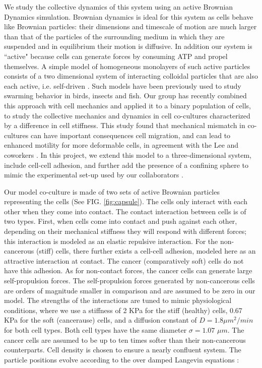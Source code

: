 \documentclass[aps,prb,twocolumn,groupedaddress,nofootinbib,floatfix]{revtex4}
\begin{document}
We study the collective dynamics of this system using an active Brownian Dynamics simulation. Brownian dynamics is ideal for this system as cells behave like Brownian particles: 
their dimensions and timescale of motion are much larger than that of the particles of the surrounding medium in which they are suspended and in equilibrium  their motion is diffusive. In addition
our system is ``active" because cells can generate forces by consuming ATP and propel themselves. A simple model of homogeneous monolayers of such active particles consists
of a two dimensional system of interacting colloidal particles that are also each active, i.e. self-driven \cite{FilyMarchetti,RednerBaskaran}. 
Such models have been previously used to study swarming  behavior \cite{Vicsek} in birds, insects and fish. Our group has recently combined this approach with cell 
mechanics and applied it to a binary population of cells, to study the collective mechanics and dynamics in cell co-cultures characterized by a difference in cell stiffness.
This study found that mechanical mismatch in co-cultures can have important consequences cell migration, and can lead to enhanced motility for more deformable cells\cite{Butcher}, 
in agreement with the Lee and coworkers \cite{Lee}. In this project, we extend this model to a three-dimensional system, include cell-cell adhesion, and further add the presence of a 
confining sphere to mimic the experimental set-up used by our collaborators \cite{Mingming}. 


Our model co-culture is made of two sets of active Brownian particles representing the cells (See FIG. \ref{fig:capsule}). The cells only interact with each other when 
they come into contact. The contact interaction between cells is of two types. First, when cells come into
contact and push against each other, depending on their mechanical stiffness they will respond with different forces; this interaction is modeled as an 
elastic repulsive interaction. For the non-cancerous (stiff) cells, there further exists a cell-cell adhesion,
modeled here as an attractive interaction at contact. The cancer (comparatively soft) cells do not have this adhesion. As for non-contact forces, 
the cancer cells can generate large self-propulsion forces. The self-propulsion forces generated by non-cancerous cells are orders of magnitude smaller in comparison 
and are assumed to be zero in our model. The strengths of the interactions are tuned to mimic physiological
conditions, where we use a stiffness of 2 KPa for the stiff (healthy) cells, 0.67 KPa for the soft (cancerause) cells, and a diffusion constant of $D=1.8 \mu m^2/min$ for both cell types. 
Both cell types have the same diameter  $\sigma = 1.07$ $\mu m$.
The cancer cells are assumed to be up to ten times softer than their non-cancerous counterparts. 
Cell density is chosen to ensure a nearly confluent system. The particle positions evolve according to the over damped 
Langevin equations \cite{Lemons,RednerBaskaran,FilyMarchetti,Butcher}: 
\end{document}
